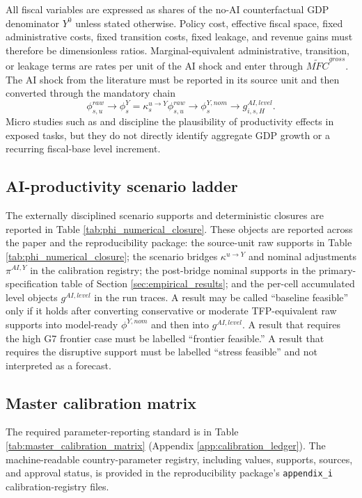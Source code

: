 \documentclass[11pt,a4paper]{article}
\begin{document}
All fiscal variables are expressed as shares of the no-AI counterfactual GDP denominator $Y^0$ unless stated otherwise. Policy cost, effective fiscal space, fixed administrative costs, fixed transition costs, fixed leakage, and revenue gains must therefore be dimensionless ratios. Marginal-equivalent administrative, transition, or leakage terms are rates per unit of the AI shock and enter through $\widetilde{MFC}^{gross}$. The AI shock from the literature must be reported in its source unit and then converted through the mandatory chain
\begin{equation}
    \phi^{raw}_{s,u}\rightarrow \phi^Y_s=\kappa^{u\to Y}_s\phi^{raw}_{s,u}\rightarrow \phi^{Y,nom}_s\rightarrow g^{AI,level}_{i,s,H}.
\end{equation}
Micro studies such as \citet{noy2023experimental} and \citet{brynjolfsson2023generative} discipline the plausibility of productivity effects in exposed tasks, but they do not directly identify aggregate GDP growth or a recurring fiscal-base level increment.

\subsection{AI-productivity scenario ladder}

The externally disciplined scenario supports and deterministic closures are reported in Table \ref{tab:phi_numerical_closure}. These objects are reported across the paper and the reproducibility package: the source-unit raw supports in Table \ref{tab:phi_numerical_closure}; the scenario bridges $\kappa^{u\to Y}$ and nominal adjustments $\pi^{AI,Y}$ in the calibration registry; the post-bridge nominal supports in the primary-specification table of Section \ref{sec:empirical_results}; and the per-cell accumulated level objects $g^{AI,level}$ in the run traces.
A result may be called ``baseline feasible'' only if it holds after converting conservative or moderate TFP-equivalent raw supports into model-ready $\phi^{Y,nom}$ and then into $g^{AI,level}$. A result that requires the high G7 frontier case must be labelled ``frontier feasible.'' A result that requires the disruptive support must be labelled ``stress feasible'' and not interpreted as a forecast.

\subsection{Master calibration matrix}

The required parameter-reporting standard is in Table \ref{tab:master_calibration_matrix} (Appendix \ref{app:calibration_ledger}). The machine-readable country-parameter registry, including values, supports, sources, and approval status, is provided in the reproducibility package's \texttt{appendix\_i} calibration-registry files.
\end{document}
